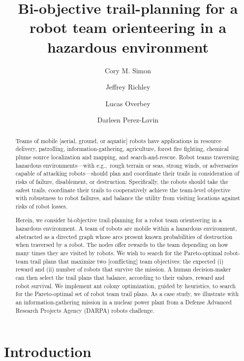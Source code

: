\documentclass[11pt, oneside]{article}
\title{
Bi-objective trail-planning for a robot team orienteering in a hazardous environment
}
\author[1]{Cory M. Simon}
\author[2]{Jeffrey Richley}
\author[2]{Lucas Overbey}
\author[2]{Darleen Perez-Lavin}
\affil[1]{School of Chemical, Biological, and Environmental Engineering. Oregon State University. Corvallis, OR. USA.}
\affil[2]{Naval Information Warfare Center Atlantic. Charleston, SC. USA.}
\begin{document}
\maketitle

\begin{abstract}
Teams of mobile [aerial, ground, or aquatic] robots have applications in resource delivery, patrolling, information-gathering, agriculture, forest fire fighting, chemical plume source localization and mapping, and search-and-rescue.
Robot teams traversing hazardous environments---with e.g.,\ rough terrain or seas, strong winds, or adversaries capable of attacking robots---should plan and coordinate their trails in consideration of risks of failure, disablement, or destruction.
Specifically, the robots should take the safest trails, coordinate their trails to cooperatively achieve the team-level objective with robustness to robot failures, and balance the utility from visiting locations against risks of robot losses.

Herein, we consider bi-objective trail-planning for a robot team orienteering in a hazardous environment.
A team of robots are mobile within a hazardous environment, abstracted as a directed graph whose arcs present known probabilities of destruction when traversed by a robot.
The nodes offer rewards to the team depending on how many times they are visited by robots.
We wish to search for the Pareto-optimal robot-team trail plans that maximize two [conflicting] team objectives: the expected (i) reward and (ii) number of robots that survive the mission. 
A human decision-maker can then select the trail plans that balance, according to their values, reward and robot survival.
We implement ant colony optimization, guided by heuristics, to search for the Pareto-optimal set of robot team trail plans. 
As a case study, we illustrate with an information-gathering mission in a nuclear power plant from a Defense Advanced Research Projects Agency (DARPA) robots challenge.

\end{abstract}

\clearpage


\section{Introduction}
\end{document}
